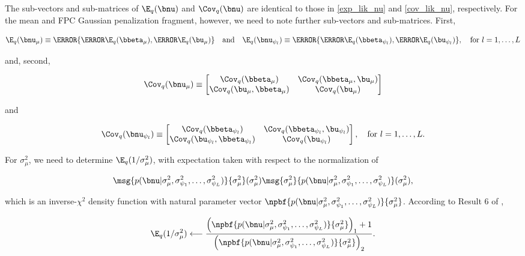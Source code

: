 \documentclass[12pt]{article}
\def\sigsqmu{\sigma^2_{\mu}}
\def\betamu{\bbeta_\mu}
\def\umu{\bu_\mu}
\def\numu{\bnu_\mu}
\newcommand\betapsi[1]{\bbeta_{\psi_{#1}}}
\newcommand\upsi[1]{\bu_{\psi_{#1}}}
\newcommand\nupsi[1]{\bnu_{\psi_{#1}}}
\newcommand\sigsqpsi[1]{\sigma^2_{\psi_{#1}}}
\theoremstyle{plain}
\theoremstyle{definition}
\theoremstyle{remark}
\begin{document}
\noindent The sub-vectors and sub-matrices of $\E_q (\bnu)$ and $\Cov_q (\bnu)$ are identical to those in
\eqref{exp_lik_nu} and \eqref{cov_lik_nu}, respectively. For the mean and FPC Gaussian penalization fragment,
however, we need to note further sub-vectors and sub-matrices. First,

\begin{equation}
	\E_q (\numu) \equiv \T{\left\{ \T{\E_q (\betamu)}, \T{\E_q (\umu)} \right\}} \quad
	\text{and} \quad
	\E_q (\nupsi{l}) \equiv \T{\left\{ \T{\E_q (\betapsi{l})}, \T{\E_q (\upsi{l})} \right\}}, \quad
	\text{for $l = 1, \dots, L$}
\label{exp_betau}
\end{equation}

\noindent and, second,

\begin{equation}
	\Cov_q (\numu) \equiv \begin{bmatrix}
		\Cov_q (\betamu) & \Cov_q (\betamu, \umu) \\
		\Cov_q (\umu, \betamu) & \Cov_q (\umu)
	\end{bmatrix}
\label{cov_betau_mu}
\end{equation}

\noindent and

\begin{equation}
	\Cov_q (\nupsi{l}) \equiv \begin{bmatrix}
		\Cov_q (\betapsi{l}) & \Cov_q (\betapsi{l}, \upsi{l}) \\
		\Cov_q (\upsi{l}, \betapsi{l}) & \Cov_q (\upsi{l})
	\end{bmatrix}, \quad
	\text{for $l = 1, \dots, L$.}
\label{cov_betau_psi}
\end{equation}

\noindent For $\sigsqmu$, we need to determine
$\E_q (1/\sigsqmu)$, with expectation taken with respect to the normalization of

\[
	\msg{p(\bnu | \sigsqmu, \sigsqpsi{1}, \dots, \sigsqpsi{L})}{\sigsqmu} (\sigsqmu)
	\msg{\sigsqmu}{p(\bnu | \sigsqmu, \sigsqpsi{1}, \dots, \sigsqpsi{L})} (\sigsqmu),
\]

\noindent which is an inverse-$\chi^2$ density function with natural parameter vector
$\npbf{p(\bnu | \sigsqmu, \sigsqpsi{1}, \dots, \sigsqpsi{L})}{\sigsqmu}$. According to Result 6 of ,

\begin{equation}
	\E_q (1/\sigsqmu)
		\longleftarrow
			\frac{
				\left( \npbf{p(\bnu | \sigsqmu, \sigsqpsi{1}, \dots, \sigsqpsi{L})}{\sigsqmu} \right)_1 + 1
			}{
				\left( \npbf{p(\bnu | \sigsqmu, \sigsqpsi{1}, \dots, \sigsqpsi{L})}{\sigsqmu} \right)_2
			}.
\label{exp_pen_sigsqmu}
\end{equation}
\end{document}
